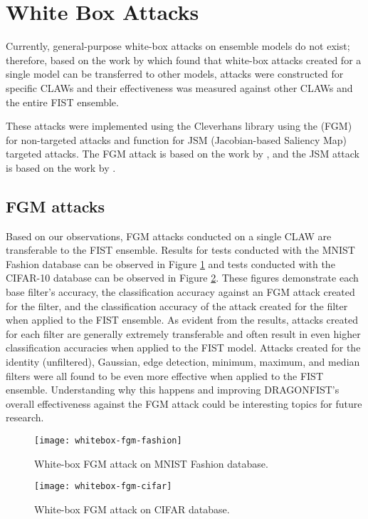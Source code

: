 \section{White Box Attacks} \label{s:whiteboxattacks}
	Currently, general-purpose white-box attacks on ensemble models do not exist; therefore, based on the work by \citeauthor{liu2016} \cite{liu2016} which found that white-box attacks created for a single model can be transferred to other models, attacks were constructed for specific CLAWs and their effectiveness was measured against other CLAWs and the entire FIST ensemble.

	These attacks were implemented using the Cleverhans library \cite{papernot2018cleverhans} using the  (FGM) for non-targeted attacks and  function for JSM (Jacobian-based Saliency Map) targeted attacks. The FGM attack is based on the work by \citeauthor{goodfellow2015} \cite{goodfellow2015}, and the JSM attack is based on the work by \citeauthor{papernot2018cleverhans} \cite{papernot2018cleverhans}.

	\subsection{FGM attacks} \label{s:whiteboxattacks:fgm}
		Based on our observations, FGM attacks conducted on a single CLAW are transferable to the FIST ensemble. Results for tests conducted with the MNIST Fashion database \cite{zalandoresearchFashionMNIST} can be observed in Figure \ref{f:whitebox:fgm:fashion} and tests conducted with the CIFAR-10 database \cite{krizhevsky2009} can be observed in Figure \ref{f:whitebox:fgm:cifar}. These figures demonstrate each base filter's accuracy, the classification accuracy against an FGM attack created for the filter, and the classification accuracy of the attack created for the filter when applied to the FIST ensemble. As evident from the results, attacks created for each filter are generally extremely transferable and often result in even higher classification accuracies when applied to the FIST model. Attacks created for the identity (unfiltered), Gaussian, edge detection, minimum, maximum, and median filters were all found to be even more effective when applied to the FIST ensemble. Understanding why this happens and improving DRAGONFIST's overall effectiveness against the FGM attack could be interesting topics for future research.
		\begin{figure}
			\texttt{[image: whitebox-fgm-fashion]}
			\caption{White-box FGM attack on MNIST Fashion database.}
			\label{f:whitebox:fgm:fashion}
		\end{figure}
		\begin{figure}
			\texttt{[image: whitebox-fgm-cifar]}
			\caption{White-box FGM attack on CIFAR database.}
			\label{f:whitebox:fgm:cifar}
		\end{figure}

